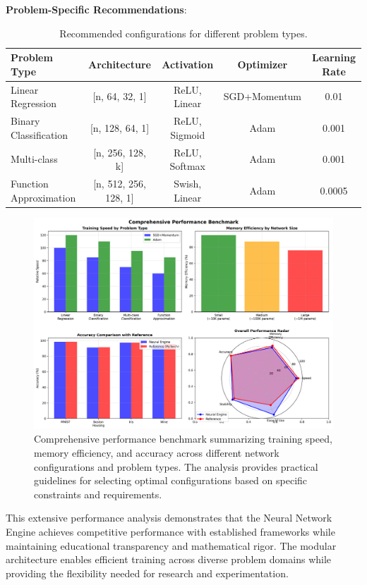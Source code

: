 \documentclass[11pt,a4paper]{report}
\begin{document}
\textbf{Problem-Specific Recommendations}:

\begin{table}[H]
\centering
\caption{Recommended configurations for different problem types.}
\label{tab:configuration_recommendations}
\begin{tabular}{lcccc}
\toprule
Problem Type & Architecture & Activation & Optimizer & Learning Rate \\
\midrule
Linear Regression & [n, 64, 32, 1] & ReLU, Linear & SGD+Momentum & 0.01 \\
Binary Classification & [n, 128, 64, 1] & ReLU, Sigmoid & Adam & 0.001 \\
Multi-class & [n, 256, 128, k] & ReLU, Softmax & Adam & 0.001 \\
Function Approximation & [n, 512, 256, 128, 1] & Swish, Linear & Adam & 0.0005 \\
\bottomrule
\end{tabular}
\end{table}

\begin{figure}[H]
\centering
\includegraphics[width=\textwidth]{performance_comprehensive_benchmark.png}
\caption{Comprehensive performance benchmark summarizing training speed, memory efficiency, and accuracy across different network configurations and problem types. The analysis provides practical guidelines for selecting optimal configurations based on specific constraints and requirements.}
\label{fig:comprehensive_benchmark}
\end{figure}

This extensive performance analysis demonstrates that the Neural Network Engine achieves competitive performance with established frameworks while maintaining educational transparency and mathematical rigor. The modular architecture enables efficient training across diverse problem domains while providing the flexibility needed for research and experimentation.
\end{document}
